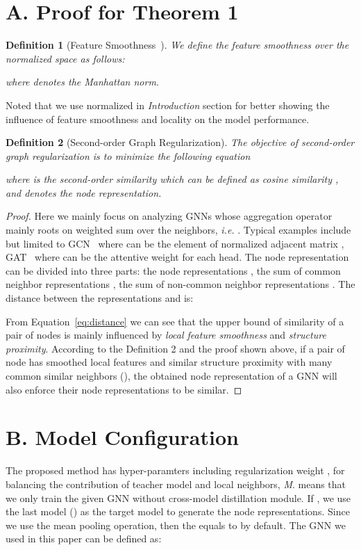 \documentclass[preprint]{article}
\newtheorem{definition}{Definition}
\begin{document}



\clearpage
\section*{A. Proof for Theorem 1}
\begin{definition}[Feature Smoothness~\cite{Hou2020Measuring}] We define the feature smoothness  over the normalized space  as follows:

where  denotes the \emph{Manhattan norm}.
\end{definition}
Noted that we use normalized  in \emph{Introduction} section for better showing the influence of feature smoothness and locality on the model performance.
\begin{definition}[Second-order Graph Regularization]
The objective of second-order graph regularization is to  minimize the following equation

where  is the second-order similarity which can be defined as cosine similarity , and  denotes the node representation.
\end{definition}
\begin{proof}
Here we mainly focus on analyzing GNNs whose aggregation operator mainly roots on weighted sum over the neighbors, \emph{i.e.} . Typical examples include but limited to GCN~\cite{kipf2016semi} where  can be the element of normalized adjacent matrix , GAT~\cite{velivckovic2017graph} where  can be the attentive weight for each head. The node representation  can be divided into three parts: the node representations , the sum of common neighbor representations , the sum of non-common neighbor representations . The distance between the representations  and  is:

From Equation~\ref{eq:distance} we can see that the upper bound of similarity of a pair of nodes is mainly influenced by \emph{local feature smoothness} and \emph{structure proximity}. According to the Definition 2 and the proof shown above, if a pair of node  has smoothed local features and similar structure proximity with many common similar neighbors (), the obtained node representation of a GNN will also enforce their node representations to be similar.
\end{proof}

\section*{B. Model Configuration}
The proposed method has hyper-paramters including regularization weight ,  for balancing the contribution of teacher model and local neighbors, \emph{M}.  means that we only train the given GNN without cross-model distillation module. If , we use the last model () as the target model to generate the node representations. Since we use the mean pooling operation, then the  equals to  by default. The GNN we used in this paper can be defined as:
\end{document}
